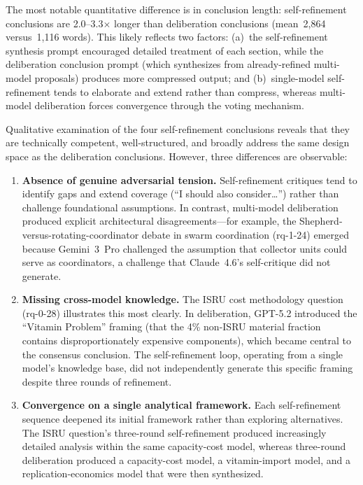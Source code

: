 \documentclass[11pt,a4paper]{article}
\begin{document}
The most notable quantitative difference is in conclusion length: self-refinement conclusions are 2.0--3.3$\times$ longer than deliberation conclusions (mean~2{,}864 versus~1{,}116 words). This likely reflects two factors: (a)~the self-refinement synthesis prompt encouraged detailed treatment of each section, while the deliberation conclusion prompt (which synthesizes from already-refined multi-model proposals) produces more compressed output; and (b)~single-model self-refinement tends to elaborate and extend rather than compress, whereas multi-model deliberation forces convergence through the voting mechanism.

Qualitative examination of the four self-refinement conclusions reveals that they are technically competent, well-structured, and broadly address the same design space as the deliberation conclusions. However, three differences are observable:

\begin{enumerate}[nosep]
    \item \textbf{Absence of genuine adversarial tension.} Self-refinement critiques tend to identify gaps and extend coverage (``I should also consider\ldots'') rather than challenge foundational assumptions. In contrast, multi-model deliberation produced explicit architectural disagreements---for example, the Shepherd-versus-rotating-coordinator debate in swarm coordination (rq-1-24) emerged because Gemini~3~Pro challenged the assumption that collector units could serve as coordinators, a challenge that Claude~4.6's self-critique did not generate.

    \item \textbf{Missing cross-model knowledge.} The ISRU cost methodology question (rq-0-28) illustrates this most clearly. In deliberation, GPT-5.2 introduced the ``Vitamin Problem'' framing (that the 4\% non-ISRU material fraction contains disproportionately expensive components), which became central to the consensus conclusion. The self-refinement loop, operating from a single model's knowledge base, did not independently generate this specific framing despite three rounds of refinement.

    \item \textbf{Convergence on a single analytical framework.} Each self-refinement sequence deepened its initial framework rather than exploring alternatives. The ISRU question's three-round self-refinement produced increasingly detailed analysis within the same capacity-cost model, whereas three-round deliberation produced a capacity-cost model, a vitamin-import model, and a replication-economics model that were then synthesized.
\end{enumerate}
\end{document}
